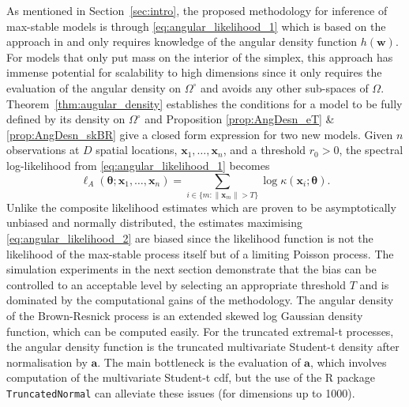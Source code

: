\documentclass[12pt]{article}
\begin{document}
As mentioned in Section~\ref{sec:intro}, the proposed methodology for inference of max-stable models is through \eqref{eq:angular_likelihood_1} which is based on the approach in \cite{Coles.Tawn:1994} and only requires knowledge of the angular density function $h(\bm w)$. For models that only put mass on the interior of the simplex, this approach has immense potential for scalability to high dimensions since it only requires the evaluation of the angular density on $\Omega^\circ$ and avoids any other sub-spaces of $\Omega$. Theorem~\ref{thm:augular_density} establishes the conditions for a model to be fully defined by its density on $\Omega^\circ$ and Proposition \ref{prop:AngDesn_eT} \& \ref{prop:AngDesn_skBR} give a closed form expression for two new models. 
Given $n$ observations at $D$ spatial locations, $\bm x_1,\dots,\bm x_n$, and a threshold $r_0>0$, the spectral log-likelihood from \eqref{eq:angular_likelihood_1} becomes
%
\begin{equation}
\label{eq:angular_likelihood_2}
\ell_A(\bm \theta;\bm x_1,\dots,\bm x_n) = 
\sum_{i \in \{m: \|\bm x_m\| > T\}} 
\log\kappa\left(\bm x_i;\bm \theta\right). 
\end{equation} 
%
Unlike the composite likelihood estimates which are proven to be asymptotically unbiased and normally distributed, the estimates maximising \eqref{eq:angular_likelihood_2} are biased since the likelihood function is not the likelihood of the max-stable process itself but of a limiting Poisson process. The simulation experiments in the next section demonstrate that the bias can be controlled to an acceptable level by selecting an appropriate threshold $T$ and is dominated by the computational gains of the methodology. The angular density of the Brown-Resnick process is an extended skewed log Gaussian density function, which can be computed easily. For the truncated extremal-t processes, the angular density function is the truncated multivariate Student-t density after normalisation by $\bm a$. The main bottleneck is the evaluation of $\bm a$, which involves computation of the multivariate Student-t cdf, but the use of the R package \texttt{TruncatedNormal} \citep{Botev.Belzile:2021} can alleviate these issues (for dimensions up to 1000). 
\end{document}
